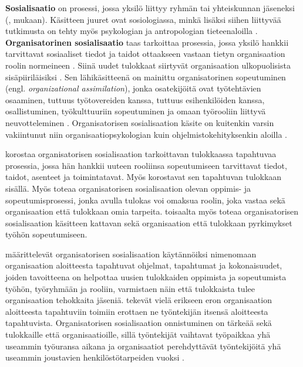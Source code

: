 \documentclass[utf8]{gradu3}
\begin{document}
\textbf{Sosialisaatio} on prosessi, jossa yksilö liittyy ryhmän tai yhteiskunnan jäseneksi (\textcite{brim-1966}, \textcite{chao-2012} mukaan). Käsitteen juuret ovat sosiologiassa, minkä lisäksi siihen liittyvää tutkimusta on tehty myös psykologian ja antropologian tieteenaloilla \parencite{chao-2012}. \textbf{Organisatorinen sosialisaatio} taas tarkoittaa prosessia, jossa yksilö hankkii tarvittavat sosiaaliset tiedot ja taidot ottaakseen vastaan tietyn organisaation roolin normeineen \parencite{van-maanen-schein-1979}. Siinä uudet tulokkaat siirtyvät organisaation ulkopuolisista sisäpiiriläisiksi \parencite{bauer-ym-2007}. Sen lähikäsitteenä on mainittu organisatorinen sopeutuminen (engl. \textit{organizational assimilation}), jonka osatekijöitä ovat työtehtävien osaaminen, tuttuus työtovereiden kanssa, tuttuus esihenkilöiden kanssa, osallistuminen, työkulttuuriin sopeutuminen ja omaan työrooliin liittyvä neuvotteleminen \parencite{gailliard-ym-2010}. Organisatorisen sosialisaation käsite on kuitenkin varsin vakiintunut niin organisaatiopsykologian kuin ohjelmistokehityksenkin aloilla %
\parencites%
[ks. esim.][]{van-maanen-schein-1979}%
{bauer-2010}%
{bauer-erdogan-2012}%
{saks-gruman-2012}%
{sharma-stol-2019}%
{britto-ym-2017}%
{johnson-senges-2010}%
\relax.
%

\textcite{wanberg-2012} korostaa organisatorisen sosialisaation tarkoittavan tulokkaassa tapahtuvaa prosessia, jossa hän hankkii uuteen rooliinsa sopeutumiseen tarvittavat tiedot, taidot, asenteet ja toimintatavat. Myös \textcite{klein-polin-2012} korostavat sen tapahtuvan tulokkaan sisällä. Myös \textcite{chao-2012} toteaa organisatorisen sosialisaation olevan oppimis- ja sopeutumisprosessi, jonka avulla tulokas voi omaksua roolin, joka vastaa sekä organisaation että tulokkaan omia tarpeita. \textcite{chao-2012} toisaalta myös toteaa organisatorisen sosialisaation käsitteen kattavan sekä organisaation että tulokkaan pyrkimykset työhön sopeutumiseen.

\textcite{saks-gruman-2012} määrittelevät organisatorisen sosialisaation käytännöiksi nimenomaan organisaation aloitteesta tapahtuvat ohjelmat, tapahtumat ja kokonaisuudet, joiden tavoitteena on helpottaa uusien tulokkaiden oppimista ja sopeutumista työhön, työryhmään ja rooliin, varmistaen näin että tulokkaista tulee organisaation tehokkaita jäseniä. \textcite{saks-gruman-2012} tekevät vielä erikseen eron organisaation aloitteesta tapahtuviin toimiin erottaen ne työntekijän itsensä aloitteesta tapahtuvista. Organisatorisen sosialisaation onnistuminen on tärkeää sekä tulokkaille että organisaatioille, sillä työntekijät vaihtavat työpaikkaa yhä useammin työuransa aikana ja organisaatiot perehdyttävät työntekijöitä yhä useammin joustavien henkilöstötarpeiden vuoksi \parencite{bauer-ym-2007}.
\end{document}
